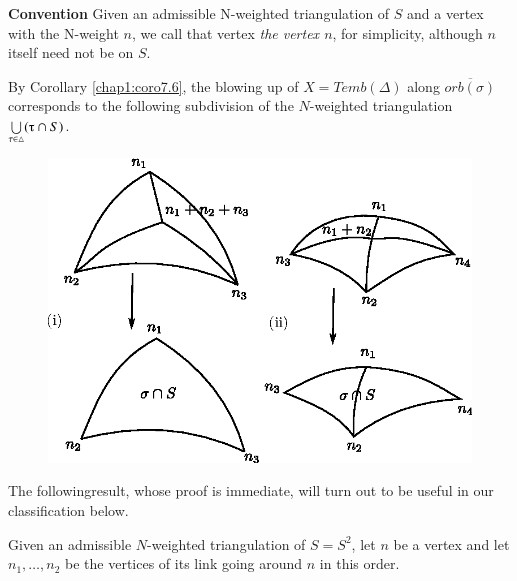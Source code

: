 \noindent
\textbf{Convention} Given an admissible N-weighted triangulation of
$S$ and a vertex with the N-weight $n$, we call that vertex {\em{the
    vertex $n$}}, for simplicity, although $n$ itself need not be on
$S$. 


By Corollary \ref{chap1:coro7.6}, the blowing up of $X=Temb (\Delta)$ along
$\overline{orb(\sigma)}$ corresponds to the following subdivision of
the $N$-weighted triangulation $\underset{\tau\in
  \triangle}{\bigcup}(\tauup \cap S)$. 
\begin{figure}[H]
\centering 
\includegraphics{vol58-fig/fig58-23.eps} 
\end{figure}
 
The following\pageoriginale result, whose proof is immediate, will
turn out to be useful in our classification below.  

\setcounter{coro}{1}
\begin{coro}\label{chap1:coro9.2}%
Given an admissible $N$-weighted triangulation of $S=S^2$, let $n$ be
a vertex and let $n_1,\ldots, n_2$ be the vertices of its link going 
around $n$ in this order. 
\end{coro}

